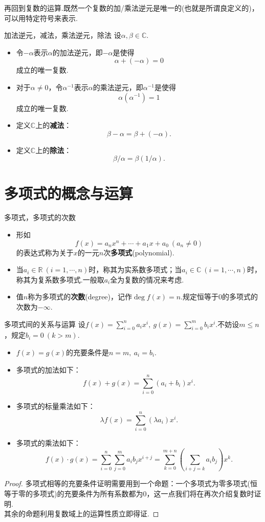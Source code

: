 \documentclass[lang=cn, zihao=5]{elegantbook}
\newcommand{\ssb}[1]{\left( #1 \right)}
\newcommand{\C}{\mathbb{C}}
\begin{document}
再回到复数的运算.既然一个复数的加/乘法逆元是唯一的(也就是所谓良定义的)，可以用特定符号来表示.

\begin{definition}{加法逆元，减法，乘法逆元，除法}
	设$\alpha , \beta \in \C $.
	\begin{itemize}
		\item 令$- \alpha$表示$\alpha$的加法逆元，即$-\alpha$是使得$$\alpha + (-\alpha) = 0$$成立的唯一复数.
		\item 对于$\alpha \neq 0$，令$\alpha ^{-1}$表示$\alpha$的乘法逆元，即$\alpha ^{-1}$是使得$$\alpha (\alpha ^{-1}) = 1$$成立的唯一复数.
		\item 定义$\C $上的\textbf{减法}：$$\beta - \alpha = \beta + (-\alpha).$$
		\item 定义$\C $上的\textbf{除法}：$$\beta / \alpha = \beta (1 / \alpha).$$
	\end{itemize}
\end{definition}

\section{多项式的概念与运算}

\begin{definition}{多项式，多项式的次数}
	\begin{itemize}
		\item 形如$$f(x) = a_nx^n + \cdots + a_1x + a_0~(a_n \neq 0)$$的表达式称为关于$x$的一元$n$次\textbf{多项式}(polynomial).
		\item 当$a_i \in \mathbb{R}~(i=1, \cdots ,n)$时，称其为实系数多项式；当$a_i \in \mathbb{C}~(i=1, \cdots ,n)$时，称其为复系数多项式.一般取$a_i$全为复数的情况来考虑.
		\item 值$n$称为多项式的\textbf{次数}(degree)，记作$\deg f(x) = n$.规定恒等于$0$的多项式的次数为$-\infty$.
	\end{itemize}
\end{definition}

\begin{theorem}{多项式间的关系与运算}
	设$f(x) = \sum_{i=0}^{n}a_i x^i,~g(x) = \sum_{i=0}^{m}b_i x^i$.不妨设$m \leq n$，规定$b_i=0~(k > m)$.
	\begin{itemize}
		\item $f(x)=g(x)$的充要条件是$n=m,~a_i=b_i$.
		\item 多项式的加法如下：$$f(x) + g(x) = \sum_{i=0}^{n} (a_i + b_i)x^{i}.$$
		\item 多项式的标量乘法如下：$$\lambda f(x) = \sum_{i=0}^{n} (\lambda a_i)x^{i}.$$
		\item 多项式的乘法如下：$$f(x) \cdot g(x) = \sum_{i=0}^{n} \sum_{j=0}^{m} a_ib_j x^{i+j} = \sum_{k=0}^{m+n} \ssb{\sum_{i+j=k}a_ib_j}x^k.$$
	\end{itemize}
\end{theorem}
\begin{proof}
	多项式相等的充要条件证明需要用到一个命题：一个多项式为零多项式(恒等于零的多项式)的充要条件为所有系数都为$0$，这一点我们将在再次介绍复数时证明. \\
	其余的命题利用复数域上的运算性质立即得证.
\end{proof}
\end{document}
